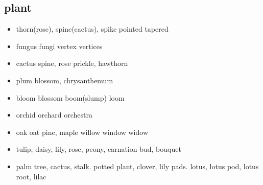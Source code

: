 \documentclass[a4paper,11pt,twoside]{book}
\begin{document}
\subsection{plant}
\begin{itemize}
	\item thorn(rose), spine(cactus), spike pointed tapered
	\item fungus fungi vertex vertices 

	\item cactus spine, rose prickle,  hawthorn
	
	\item plum blossom, chrysanthemum
	
	\item bloom blossom boom(slump) loom
	
	\item orchid orchard orchestra
	
	\item oak oat pine, maple willow window widow
	
	\item tulip, daisy, lily, rose, peony, carnation bud, bouquet 
	
	\item palm tree, cactus, stalk. potted plant, clover, lily pads. lotus, lotus pod, lotus root, lilac
	
	
\end{itemize}
\end{document}
